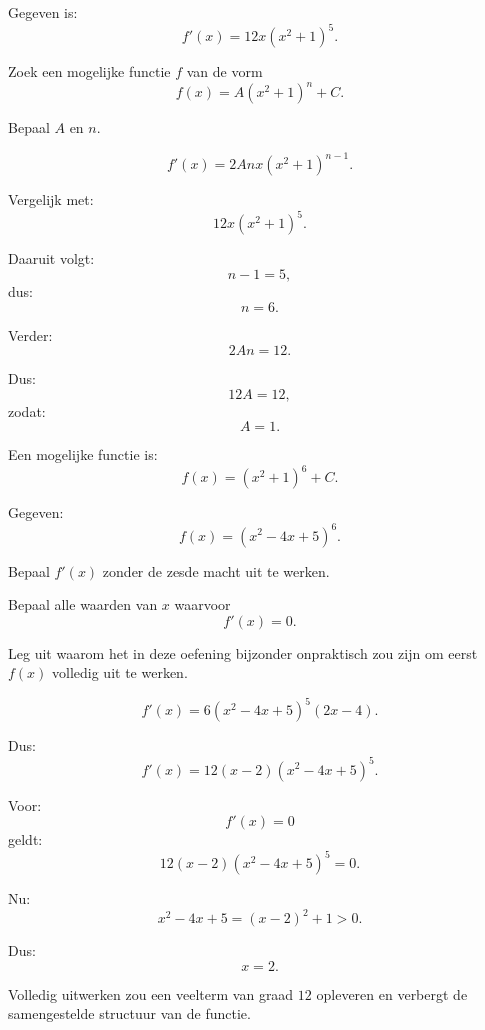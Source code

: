 \documentclass{ximera}
\begin{document}
\begin{oefening}{\oefG}

Gegeven is:
\[
f'(x)=12x(x^2+1)^5.
\]

Zoek een mogelijke functie $f$ van de vorm
\[
f(x)=A(x^2+1)^n+C.
\]

Bepaal $A$ en $n$.

\begin{oplossing}

\[
f'(x)=2Anx(x^2+1)^{n-1}.
\]

Vergelijk met:
\[
12x(x^2+1)^5.
\]

Daaruit volgt:
\[
n-1=5,
\]
dus:
\[
n=6.
\]

Verder:
\[
2An=12.
\]

Dus:
\[
12A=12,
\]
zodat:
\[
A=1.
\]

Een mogelijke functie is:
\[
\boxed{f(x)=(x^2+1)^6+C.}
\]

\end{oplossing}

\end{oefening}



\begin{oefening}{\oefG}

Gegeven:
\[
f(x)=(x^2-4x+5)^6.
\]

\begin{question}
Bepaal $f'(x)$ zonder de zesde macht uit te werken.
\end{question}

\begin{question}
Bepaal alle waarden van $x$ waarvoor
\[
f'(x)=0.
\]
\end{question}

\begin{question}
Leg uit waarom het in deze oefening bijzonder onpraktisch zou zijn
om eerst $f(x)$ volledig uit te werken.
\end{question}

\begin{oplossing}

\[
f'(x)=6(x^2-4x+5)^5(2x-4).
\]

Dus:
\[
\boxed{f'(x)=12(x-2)(x^2-4x+5)^5.}
\]

Voor:
\[
f'(x)=0
\]
geldt:
\[
12(x-2)(x^2-4x+5)^5=0.
\]

Nu:
\[
x^2-4x+5=(x-2)^2+1>0.
\]

Dus:
\[
\boxed{x=2.}
\]

Volledig uitwerken zou een veelterm van graad $12$ opleveren en verbergt
de samengestelde structuur van de functie.

\end{oplossing}

\end{oefening}
\end{document}
